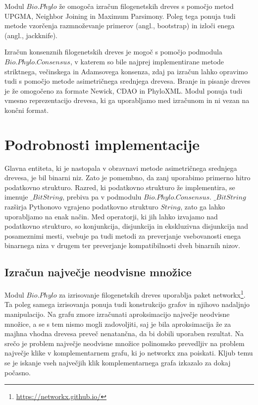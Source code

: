 \documentclass[a4paper, 12pt]{book}
\begin{document}
\noindent Modul $Bio.Phylo$ že omogoča izračun filogenetskih dreves s pomočjo 
metod UPGMA, Neighbor Joining in Maximum Parsimony. Poleg tega ponuja 
tudi metode vzorčenja razmnoževanje primerov (angl., bootstrap) in izloči enega (angl., jackknife).  

Izračun konsenznih filogenetskih dreves je mogoč s pomočjo podmodula 
$Bio.Phylo.Consensus$, v katerem so bile najprej implementirane metode 
striktnega, večinskega in Adamsovega konsenza, zdaj pa izračun lahko 
opravimo tudi s pomočjo metode asimetričnega srednjega drevesa. Branje 
in pisanje dreves je že omogočeno za formate Newick, CDAO in PhyloXML. 
Modul ponuja tudi vmesno reprezentacijo drevesa, ki ga uporabljamo med 
izračunom in ni vezan na končni format.

\section{Podrobnosti implementacije}
Glavna entiteta, ki je nastopala v obravnavi metode asimetričnega srednjega 
drevesa, je bil binarni niz. Zato je pomembno, da zanj uporabimo primerno hitro 
podatkovno strukturo. Razred, ki podatkovno strukturo že implementira, se 
imenuje $\_BitString$, prebiva pa v podmodulu $Bio.Phylo.Consensus$. 
$\_BitString$ razširja Pythonovo vgrajeno podatkovno strukturo $String$, 
zato ga lahko uporabljamo na enak način. Med operatorji, ki jih lahko izvajamo 
nad podatkovno strukturo, so konjunkcija, disjunkcija in ekskluzivna 
disjunkcija nad posameznimi mesti, vsebuje pa tudi metodi za preverjanje 
vsebovanosti enega binarnega niza v drugem ter preverjanje kompatibilnosti 
dveh binarnih nizov. 

\subsection{Izračun največje neodvisne množice}
Modul $Bio.Phylo$ za izrisovanje filogenetskih dreves uporablja paket 
networkx\footnote{\url{https://networkx.github.io/}}. Ta poleg samega 
izrisovanja ponuja tudi konstrukcijo grafov in njihovo nadaljnjo 
manipulacijo. Na grafu zmore izračunati aproksimacijo največje neodvisne 
množice, a se s tem nismo mogli zadovoljiti, saj je bila aproksimacija že 
za majhna vhodna drevesa preveč nenatančna, da bi dobili uporaben rezultat. 
Na srečo je problem največje neodvisne množice polinomsko prevedljiv na 
problem največje klike v komplementarnem grafu, ki jo networkx zna poiskati.
Kljub temu se je iskanje vseh največjih klik komplementarnega grafa izkazalo 
za dokaj počasno. 
\end{document}
